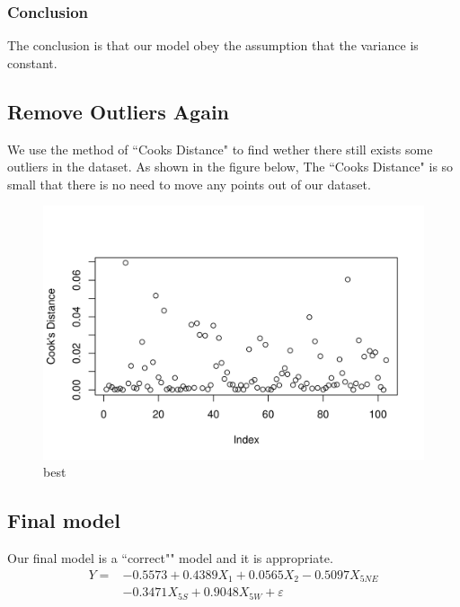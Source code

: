 \documentclass[a4paper,11pt,onecolumn,twoside]{article}
\begin{document}
\subsubsection{Conclusion}
The conclusion is that our model obey the assumption that the variance is constant.
\subsection{Remove  Outliers Again}
We use the method of ``Cooks Distance" to find wether there still exists some outliers in the dataset. As shown in the figure below, The ``Cooks Distance" is so small that there is no need to move any points out of our dataset.
 \begin{figure}[H]
	\centering
	\includegraphics[width=.65\textwidth,height=.35\textheight]{cooks_distance.png} %
	\caption{best} %
	\label{img} %
\end{figure}
\subsection{Final model}
Our final model is a ``correct"" model and it is appropriate.
\begin{equation}
\begin{split}
Y= &-0.5573+0.4389X_1+0.0565X_2-0.5097X_{5NE}\\&-0.3471X_{5S}+0.9048X_{5W} +\varepsilon
\end{split}
\end{equation}
\end{document}
